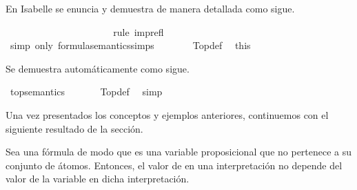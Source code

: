 \begin{isabellebody}
\begin{isamarkuptext}
  En Isabelle se enuncia y demuestra de manera detallada como sigue.%
\end{isamarkuptext}\isamarkuptrue%
\isamarkupfalse%
\ \ {\isachardoublequoteopen}{\isasymA}\ {\isasymTurnstile}\ {\isasymtop}{\isachardoublequoteclose}\ \isanewline
%
\isadelimproof
%
\endisadelimproof
%
\isatagproof
{}\isamarkupfalse%
\ {\isacharminus}\isanewline
\ \isamarkupfalse%
\ {\isachardoublequoteopen}{\isasymA}\ {\isasymTurnstile}\ {\isasymbottom}\ {\isasymlongrightarrow}\ {\isasymA}\ {\isasymTurnstile}\ {\isasymbottom}{\isachardoublequoteclose}\ \isanewline
\ \ \ \isamarkupfalse%
\ {\isacharparenleft}rule\ imp{\isacharunderscore}refl{\isacharparenright}\isanewline
\ \isamarkupfalse%
\ \isamarkupfalse%
\ {\isachardoublequoteopen}{\isasymA}\ {\isasymTurnstile}\ {\isacharparenleft}{\isasymbottom}\ \isactrlbold {\isasymrightarrow}\ {\isasymbottom}{\isacharparenright}{\isachardoublequoteclose}\isanewline
\ \ \ \isamarkupfalse%
\ {\isacharparenleft}simp\ only{\isacharcolon}\ formula{\isacharunderscore}semantics{\isachardot}simps{\isacharparenleft}{}{\isacharparenright}{\isacharparenright}\isanewline
\ \isamarkupfalse%
\ {\isachardoublequoteopen}{\isasymA}\ {\isasymTurnstile}\ {\isasymtop}{\isachardoublequoteclose}\ \isamarkupfalse%
\ Top{\isacharunderscore}def\ \isamarkupfalse%
\ this\isanewline
{}\isamarkupfalse%
%
\endisatagproof
{\isafoldproof}%
%
\isadelimproof
%
\endisadelimproof
%
\begin{isamarkuptext}%
Se demuestra automáticamente como sigue.%
\end{isamarkuptext}\isamarkuptrue%
\isamarkupfalse%
\ top{\isacharunderscore}semantics{\isacharcolon}\ {\isachardoublequoteopen}{\isasymA}\ {\isasymTurnstile}\ {\isasymtop}{\isachardoublequoteclose}\isanewline
%
\isadelimproof
\ \ %
\endisadelimproof
%
\isatagproof
{}\isamarkupfalse%
\ Top{\isacharunderscore}def\ \isamarkupfalse%
\ simp%
\endisatagproof
{\isafoldproof}%
%
\isadelimproof
%
\endisadelimproof
%
\begin{isamarkuptext}%
Una vez presentados los conceptos y ejemplos anteriores, 
  continuemos con el siguiente resultado de la sección.

  \begin{lema}
  Sea una fórmula  de modo que  es una variable proposicional que 
  no pertenece a su conjunto de átomos. Entonces, el valor de  en 
  una interpretación no depende del valor de la variable  en dicha 
  interpretación.
  \end{lema}


\end{isamarkuptext}
\end{isabellebody}
